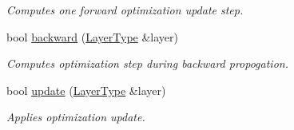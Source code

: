 \begin{DoxyCompactItemize}
\begin{DoxyCompactList}\small\item\em Computes one forward optimization update step. \end{DoxyCompactList}\item 
bool \hyperlink{classffnn_1_1optimizer_1_1_gradient_descent_3_01layer_1_1_local_convolution_3_01_t_a_r_g_s_01_4_01_4_ab9bd2d9c46a329a2652a397ef01d77aa}{backward} (\hyperlink{classffnn_1_1optimizer_1_1_gradient_descent_3_01layer_1_1_local_convolution_3_01_t_a_r_g_s_01_4_01_4_a16ba9a242dbe61604f16ff2ae19a4d1f}{Layer\-Type} \&layer)
\begin{DoxyCompactList}\small\item\em Computes optimization step during backward propogation. \end{DoxyCompactList}\item 
bool \hyperlink{classffnn_1_1optimizer_1_1_gradient_descent_3_01layer_1_1_local_convolution_3_01_t_a_r_g_s_01_4_01_4_a78a1029caa29a3f5d1548a85dac1a4dd}{update} (\hyperlink{classffnn_1_1optimizer_1_1_gradient_descent_3_01layer_1_1_local_convolution_3_01_t_a_r_g_s_01_4_01_4_a16ba9a242dbe61604f16ff2ae19a4d1f}{Layer\-Type} \&layer)
\begin{DoxyCompactList}\small\item\em Applies optimization update. \end{DoxyCompactList}\end{DoxyCompactItemize}
